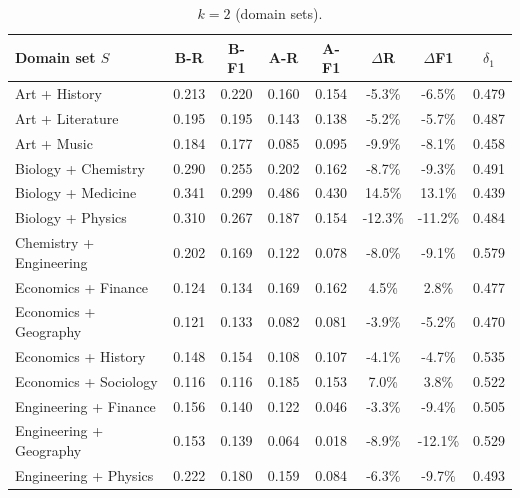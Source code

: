 \begin{table}[!ht]

\begin{subtable}[t]{\textwidth}
\caption{$k{=}2$ (domain sets).}
\centering
\begin{tabular}{lccccccc}
\toprule
Domain set $S$ &
B-R & B-F1 &
A-R & A-F1 &
$\Delta$R & $\Delta$F1 &
$\delta_1$ \\
\midrule
Art + History                                      & 0.213 & 0.220 & 0.160 & 0.154 & -5.3\% & -6.5\% & 0.479 \\
Art + Literature                                   & 0.195 & 0.195 & 0.143 & 0.138 & -5.2\% & -5.7\% & 0.487 \\
Art + Music                                        & 0.184 & 0.177 & 0.085 & 0.095 & -9.9\% & -8.1\% & 0.458 \\
Biology + Chemistry                                & 0.290 & 0.255 & 0.202 & 0.162 & -8.7\% & -9.3\% & 0.491 \\
Biology + Medicine                                 & 0.341 & 0.299 & 0.486 & 0.430 & 14.5\% & 13.1\% & 0.439 \\
Biology + Physics                                  & 0.310 & 0.267 & 0.187 & 0.154 & -12.3\% & -11.2\% & 0.484 \\
Chemistry + Engineering                            & 0.202 & 0.169 & 0.122 & 0.078 & -8.0\% & -9.1\% & 0.579 \\
Economics + Finance                                & 0.124 & 0.134 & 0.169 & 0.162 & 4.5\% & 2.8\% & 0.477 \\
Economics + Geography                              & 0.121 & 0.133 & 0.082 & 0.081 & -3.9\% & -5.2\% & 0.470 \\
Economics + History                                & 0.148 & 0.154 & 0.108 & 0.107 & -4.1\% & -4.7\% & 0.535 \\
Economics + Sociology                              & 0.116 & 0.116 & 0.185 & 0.153 & 7.0\% & 3.8\% & 0.522 \\
Engineering + Finance                              & 0.156 & 0.140 & 0.122 & 0.046 & -3.3\% & -9.4\% & 0.505 \\
Engineering + Geography                            & 0.153 & 0.139 & 0.064 & 0.018 & -8.9\% & -12.1\% & 0.529 \\
Engineering + Physics                              & 0.222 & 0.180 & 0.159 & 0.084 & -6.3\% & -9.7\% & 0.493 \\

\end{tabular}
\end{subtable}
\end{table}
